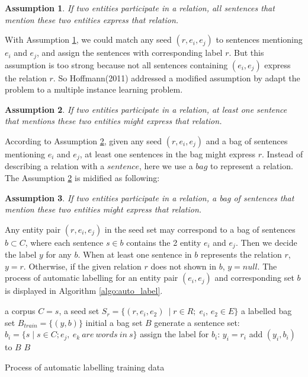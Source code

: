 \newtheorem{theorem}{Assumption}
\begin{theorem}
\label{theo:ds}
If two entities participate in a relation, all sentences that mention these two entities express that relation.
\end{theorem}

With Assumption \ref{theo:ds}, we could match any seed $(r,e_i,e_j)$ to sentences mentioning $e_i$ and $e_j$, and assign the sentences with corresponding label $r$.
But this assumption is too strong because not all sentences containing $(e_i,e_j)$ express the relation $r$.
So Hoffmann(2011)\cite{hoffmann_knowledge} addressed a modified assumption by adapt the problem to a multiple instance learning problem.

\begin{theorem}
\label{theo:mil}
If two entities participate in a relation, at least one sentence that mentions these two entities might express that relation.
\end{theorem}

According to Assumption \ref{theo:mil}, given any seed $(r,e_i,e_j)$ and a bag of sentences mentioning $e_i$ and $e_j$, at least one sentences in the bag might express $r$.
Instead of describing a relation with a $sentence$, here we use a $bag$ to represent a relation.
The Assumption \ref{theo:mil} is midified as following:

\begin{theorem}
\label{theo:my}
If two entities participate in a relation, a bag of sentences that mention these two entities might express that relation.
\end{theorem}

Any entity pair $(r, e_i, e_j)$ in the seed set may correspond to a bag of sentences $b \subset C$, where each sentence $s \in b$ contains the 2 entity $e_i$ and $e_j$.
Then we decide the label $y$ for any $b$.
When at least one sentence in $b$ represents the relation $r$, $y=r$.
Otherwise, if the given relation $r$ does not shown in $b$, $y=null$.
The process of automatic labelling for an entity pair $(e_i, e_j)$ and corresponding set $b$ is displayed in Algorithm \ref{algo:auto_label}.

\begin{algorithm}
\begin{algorithmic}[1]
\renewcommand{\algorithmicrequire}{\textbf{Input:}}
\renewcommand{\algorithmicensure}{\textbf{Output:}}
    \REQUIRE a corpus $C={s}$, a seed set $S_r = \{(r,e_i,e_2)\ \mid r\in R;\; e_i,\,e_2\in E\}$
    \ENSURE a labelled bag set $B_{train} = \{(y,b)\}$
    \STATE initial a bag set $B$
    \STATE generate a sentence set: $b_i=\{s \mid s\in C; e_j,\ e_k\ are\ words\ in\ s\}$
    \STATE assign the label for $b_i$: $y_i = r_i$
    \STATE add $(y_i,b_i)$ to $B$
    \ENDFOR
    \RETURN $B$
\end{algorithmic}
\caption[Process of automatic labelling training data]{Process of automatic labelling training data}
\label{algo:auto_label}
\end{algorithm}

